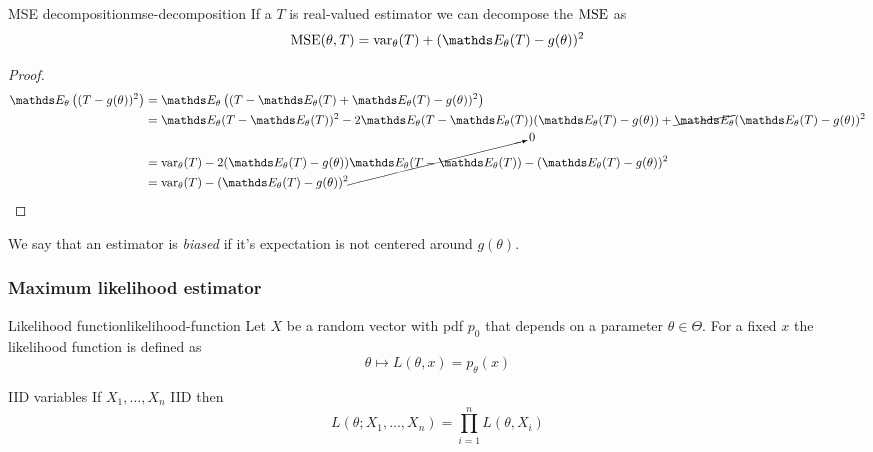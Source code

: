 \documentclass[12pt]{extarticle}
\begin{document}
\begin{proposition}{MSE decomposition}{mse-decomposition}
	If a $T$ is real-valued estimator we can decompose the $\MSE$ as
	\begin{equation}
		\MSE(\theta, T) = \var_\theta(T) + (\E_\theta(T) - g(\theta))^2
	\end{equation}
\end{proposition}
\begin{proof}
	\begin{align}
		\E_\theta\left((T - g(\theta))^2\right) & = \E_\theta\left((T -\E_\theta(T) + \E_\theta(T) - g(\theta))^2\right)                                                                \\
		                                        & = \E_\theta(T-\E_\theta(T))^2 - 2\E_\theta(T-\E_\theta(T))(\E_\theta(T) - g(\theta)) + \cancel{\E_\theta}(\E_\theta(T) - g(\theta))^2 \\
		                                        & = \var_\theta(T) - 2 (\E_\theta(T) - g(\theta)) \cancelto{0}{\E_\theta(T-\E_\theta(T))} - (\E_\theta(T) - g(\theta))^2                \\
		                                        & = \var_\theta(T) - (\E_\theta(T) - g(\theta))^2
	\end{align}
\end{proof}

We say that an estimator is \emph{biased} if it's expectation is not centered around $g(\theta)$.

\subsubsection{Maximum likelihood estimator}

\begin{definition}{Likelihood function}{likelihood-function}
	Let $X$ be a random vector with pdf $p_0$ that depends on a parameter $\theta \in \Theta$.
	For a fixed $x$ the likelihood function is defined as
	\begin{equation}
		\theta \mapsto L(\theta, x) = p_\theta(x)
	\end{equation}
\end{definition}

\begin{lemma}{IID variables}{}
	If $X_1, \dots, X_n$ IID then
	\begin{equation}
		L(\theta; X_1, \dots, X_n) = \prod_{i = 1}^{n} L(\theta, X_i)
	\end{equation}
\end{lemma}
\end{document}
